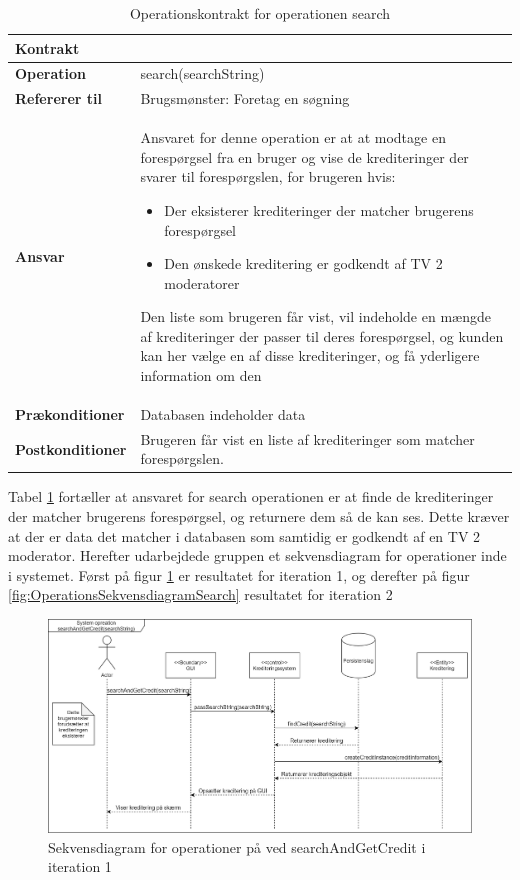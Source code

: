 \begin{table}[H]
\centering
\label{tab:2}
    \begin{tabular}{|p{35mm}|p{70mm}|} \hline
        \textbf{Kontrakt} &  \\ \hline
        \textbf{Operation} & search(searchString) \\ \hline
        \textbf{Refererer til} & Brugsmønster: Foretag en søgning \\ \hline
        \textbf{Ansvar} & Ansvaret for denne operation er at at modtage en forespørgsel fra en bruger og vise de krediteringer der svarer til forespørgslen, for brugeren hvis:
        \begin{itemize}
            \item Der eksisterer krediteringer der matcher brugerens forespørgsel
            \item Den ønskede kreditering er godkendt af TV 2 moderatorer 
        \end{itemize}
        Den liste som brugeren får vist, vil indeholde en mængde af krediteringer der passer til deres forespørgsel, og kunden kan her vælge en af disse krediteringer, og få yderligere information om den\\ \hline
        \textbf{Prækonditioner} & Databasen indeholder data\\ \hline
        \textbf{Postkonditioner} &
        Brugeren får vist en liste af krediteringer som matcher forespørgslen.\\ \hline
    \end{tabular}
        \caption{Operationskontrakt for operationen search}
        \label{tab:OperationsKontraktB03}
\end{table}

Tabel \ref{tab:OperationsKontraktB03} fortæller at ansvaret for search operationen er at finde de krediteringer der matcher brugerens forespørgsel, og returnere dem så de kan ses. Dette kræver at der er data det matcher i databasen som samtidig er godkendt af en TV 2 moderator.
Herefter udarbejdede gruppen et sekvensdiagram for operationer inde i systemet. Først på figur \ref{fig:B03OSDit1} er resultatet for iteration 1, og derefter på figur \ref{fig:OperationsSekvensdiagramSearch} resultatet for iteration 2

\begin{figure}[H]
\centerline{\includegraphics[scale = 0.37]{images/B03OSDit1.png}}
    \caption{Sekvensdiagram for operationer på ved searchAndGetCredit i iteration 1}
    \label{fig:B03OSDit1}
\end{figure}

